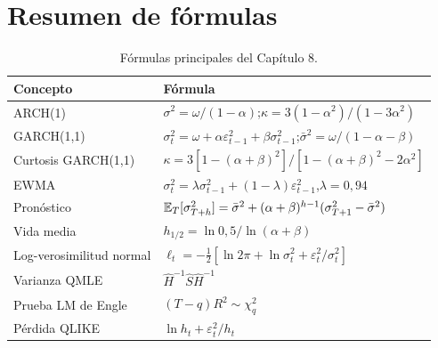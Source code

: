 \section{Resumen de fórmulas}

\begin{table}[H]
\centering\small
\begin{tabular}{@{}ll@{}}
\toprule
Concepto & Fórmula \\
\midrule
ARCH(1) & $\sigma^2=\omega/(1-\alpha)$;\quad $\kappa=3(1-\alpha^2)/(1-3\alpha^2)$ \\
GARCH(1,1) & $\sigma_t^2=\omega+\alpha\varepsilon_{t-1}^2+\beta\sigma_{t-1}^2$;\quad $\bar\sigma^2=\omega/(1-\alpha-\beta)$ \\
Curtosis GARCH(1,1) & $\kappa=3[1-(\alpha+\beta)^2]/[1-(\alpha+\beta)^2-2\alpha^2]$ \\
EWMA & $\sigma_t^2=\lambda\sigma_{t-1}^2+(1-\lambda)\varepsilon_{t-1}^2$,\quad $\lambda=0{,}94$ \\
Pronóstico & $\mathbb{E}_T[\sigma_{T+h}^2]=\bar\sigma^2+(\alpha+\beta)^{h-1}(\sigma_{T+1}^2-\bar\sigma^2)$ \\
Vida media & $h_{1/2}=\ln0{,}5/\ln(\alpha+\beta)$ \\
Log-verosimilitud normal & $\ell_t=-\frac12[\ln2\pi+\ln\sigma_t^2+\varepsilon_t^2/\sigma_t^2]$ \\
Varianza QMLE & $\hat H^{-1}\hat S\hat H^{-1}$ \\
Prueba LM de Engle & $(T-q)R^2\sim\chi^2_q$ \\
Pérdida QLIKE & $\ln h_t+\varepsilon_t^2/h_t$ \\
\bottomrule
\end{tabular}
\caption{Fórmulas principales del Capítulo 8.}
\end{table}

